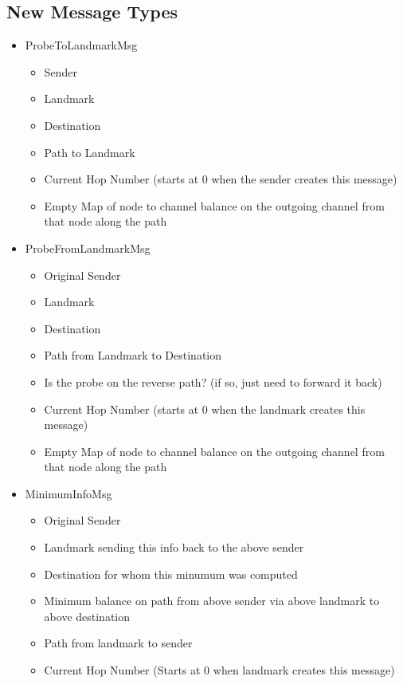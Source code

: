 \documentclass[a4paper]{article}
\begin{document}
\subsection{New Message Types}
    \begin{itemize}
        \item ProbeToLandmarkMsg
                \begin{itemize} 
                \item Sender
                \item Landmark
                \item Destination
                \item Path to Landmark
                \item Current Hop Number (starts at 0 when the sender creates this message)
                \item Empty Map of node to channel balance on the outgoing channel from that node along the path
                \end{itemize}
        \item ProbeFromLandmarkMsg
                \begin{itemize} 
                \item Original Sender
                \item Landmark
                \item Destination
                \item Path from Landmark to Destination
                \item Is the probe on the reverse path? (if so, just need to forward it back)
                \item Current Hop Number (starts at 0 when the landmark creates this message)
                \item Empty Map of node to channel balance on the outgoing channel from that node along the path
                \end{itemize}
        \item MinimumInfoMsg
            \begin{itemize}
                \item Original Sender
                \item Landmark sending this info back to the above sender
                \item Destination for whom this minumum was computed
                \item Minimum balance on path from above sender via above landmark to above destination
                \item Path from landmark to sender
                \item Current Hop Number (Starts at 0 when landmark creates this message)
            \end{itemize}
    \end{itemize}
\end{document}
